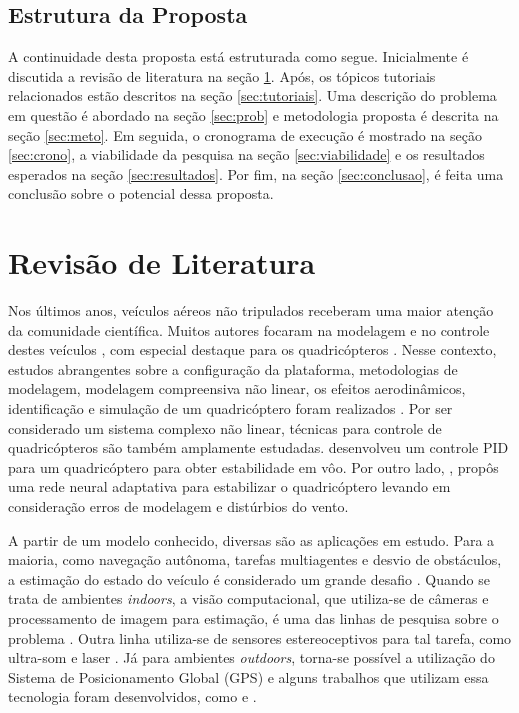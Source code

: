 \documentclass[a4paper, 12pt]{article}
\begin{document}
\subsection{Estrutura da Proposta}

A continuidade desta proposta está estruturada como segue. Inicialmente é discutida a revisão de literatura na seção \ref{sec:rev}. Após, os tópicos tutoriais relacionados estão descritos na seção \ref{sec:tutoriais}. Uma descrição do problema em questão é abordado na seção \ref{sec:prob} e metodologia proposta é descrita na seção \ref{sec:meto}. Em seguida, o cronograma de execução é mostrado na seção \ref{sec:crono}, a viabilidade da pesquisa na seção \ref{sec:viabilidade} e os resultados esperados na seção \ref{sec:resultados}. Por fim, na seção \ref{sec:conclusao}, é feita uma conclusão sobre o potencial dessa proposta. 

\newpage

\section{Revisão de Literatura}
\label{sec:rev}

Nos últimos anos, veículos aéreos não tripulados receberam uma maior atenção da comunidade científica. Muitos autores focaram na modelagem e no controle destes veículos \cite{Ye2006},  com especial destaque para os quadricópteros \cite{Altug2002}. Nesse contexto, estudos abrangentes sobre a configuração da plataforma, metodologias de modelagem, modelagem compreensiva não linear, os efeitos aerodinâmicos, identificação e simulação de um quadricóptero foram realizados \cite{Zhang2014} \cite{Gibiansky2010}. Por ser considerado um sistema complexo não linear, técnicas para controle de quadricópteros são também amplamente estudadas. \cite{Salih2010} desenvolveu um controle PID para um quadricóptero para obter estabilidade em vôo. Por outro lado, \cite{Nicol2008}, propôs uma rede neural adaptativa para estabilizar o quadricóptero levando em consideração erros de modelagem e distúrbios do vento.

A partir de um modelo conhecido, diversas são as aplicações em estudo. Para a maioria, como navegação autônoma, tarefas multiagentes e desvio de obstáculos, a estimação do estado do veículo é considerado um grande desafio \cite{Achtelik2009}. Quando se trata de ambientes \textit{indoors}, a visão computacional, que utiliza-se de câmeras e processamento de imagem para estimação, é uma das linhas de pesquisa sobre o problema \cite{Shen2013} \cite{Blosch2010} \cite{Shen2013a}. Outra linha utiliza-se de sensores estereoceptivos para tal tarefa, como ultra-som \cite{Roberts2007} e laser \cite{Grzonka2012}. Já para ambientes \textit{outdoors}, torna-se possível a utilização do Sistema de Posicionamento Global (GPS) e alguns trabalhos que utilizam essa tecnologia foram desenvolvidos, como  \cite{Hoffmann2004} e \cite{Wendel2006}.
\end{document}
